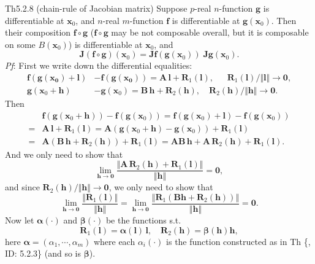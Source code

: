 \documentclass{article}
\begin{document}
\begin{Th}{Th5.2.8 (chain-rule of Jacobian matrix)}
    Suppose $p$-real $n$-function $\pmb{g}$ is differentiable at $\pmb{x}_0$, and $n$-real $m$-function $\pmb{f}$ is differentiable at $\pmb{g}(\pmb{x}_0)$. Then their composition $\pmb{f}\circ\pmb{g}$ ($\pmb{f}\circ\pmb{g}$ may be not composable overall, but it is composable on some $B(\pmb{x}_0)$) is differentiable at $\pmb{x}_0$, and
    $$ \pmb{J}(\pmb{f}\circ\pmb{g})(\pmb{x}_0) = \pmb{Jf}(\pmb{g}(\pmb{x}_0))\;\pmb{Jg}(\pmb{x}_0). $$
    \tcblower
    \textit{Pf}: First we write down the differential equalities:
    $$ 
    \begin{aligned}
        \pmb{f}(\pmb{g}(\pmb{x_0}) + \pmb{l}) &- \pmb{f}(\pmb{g}(\pmb{x_0})) = \pmb{A\,l} + \pmb{R}_1(\pmb{l}), \quad\;\; \pmb{R}_1(\pmb{l})/\Vert\pmb{l}\Vert\rightarrow\pmb{0},\\
        \pmb{g}(\pmb{x}_0 + \pmb{h}) &- \pmb{g}(\pmb{x}_0) = \pmb{B\,h} + \pmb{R}_2(\pmb{h}), \quad \pmb{R}_2(\pmb{h})/\Vert\pmb{h}\Vert\rightarrow\pmb{0}.
    \end{aligned}
    $$
    Then
    $$ 
    \begin{aligned}
        & \pmb{f}(\pmb{g}(\pmb{x}_0 + \pmb{h})) - \pmb{f}(\pmb{g}(\pmb{x}_0)) = \pmb{f}(\pmb{g}(\pmb{x}_0) + \pmb{l}) - \pmb{f}(\pmb{g}(\pmb{x}_0)) \\
        = & \pmb{A\,l} + \pmb{R}_1(\pmb{l}) = \pmb{A}(\pmb{g}(\pmb{x}_0 + \pmb{h}) - \pmb{g}(\pmb{x}_0)) + \pmb{R}_1(\pmb{l}) \\
        = & \pmb{A}(\pmb{B\,h} + \pmb{R}_2(\pmb{h})) + \pmb{R}_1(\pmb{l}) = \pmb{AB\,h} + \pmb{A\,R}_2(\pmb{h}) + \pmb{R}_1(\pmb{l}).
    \end{aligned}
    $$
    And we only need to show that 
    $$ \lim_{\pmb{h}\to\pmb{0}}\frac{\Vert\pmb{A\,R}_2(\pmb{h}) + \pmb{R}_1(\pmb{l})\Vert}{\Vert\pmb{h}\Vert} = \pmb{0}, $$
    and since $\pmb{R}_2(\pmb{h})/\Vert\pmb{h}\Vert\rightarrow\pmb{0}$, we only need to show that
    \begin{equation}
        \lim\limits_{\pmb{h}\to\pmb{0}}\frac{\Vert\pmb{R}_1(\pmb{l})\Vert}{\Vert\pmb{h}\Vert} = \lim\limits_{\pmb{h}\to\pmb{0}}\frac{\Vert\pmb{R}_1(\pmb{Bh} + \pmb{R}_2(\pmb{h}))\Vert}{\Vert\pmb{h}\Vert} = \pmb{0}.
        \label{e1}
    \end{equation}
    Now let $\pmb{\alpha}(\cdot)$ and $\pmb{\beta}(\cdot)$ be the functions s.t. 
    $$ \pmb{R}_1(\pmb{l}) = \pmb{\alpha}(\pmb{l})\,\pmb{l},\quad \pmb{R}_2(\pmb{h}) = \pmb{\beta}(\pmb{h})\pmb{h}, $$
    here $\pmb{\alpha} = (\alpha_1, \cdots, \alpha_m)$ where each $\alpha_i(\cdot)$ is the function constructed as in Th \{, ID: 5.2.3\} (and so is $\pmb{\beta}$). 

\end{Th}
\end{document}
